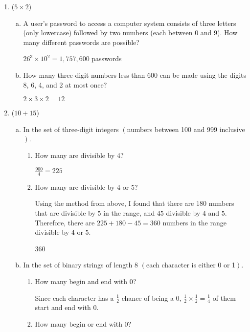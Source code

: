 \documentclass[12pt]{article}
\begin{document}
	\begin{enumerate}

		\item ($5 \times 2$)
		\begin{enumerate}[a.]
			\item
			A user's password to access a computer system consists of three letters (only lowercase) followed by two numbers (each between 0 and 9). How many different passwords are possible?

			$26^3 \times 10^2 = 1,757,600$ passwords

			\item
			How many three-digit numbers less than 600 can be made using the digits 8, 6, 4, and 2 at most once?

			$2 \times 3 \times 2 = 12$
		\end{enumerate}

	\newpage

		\item ($10 + 15$)
		\begin{enumerate}[a.]
			\item
			In the set of three-digit integers $\left( \right.$numbers between 100 and 999 inclusive$\left. \right)$.
			\begin{enumerate}
				\item  How many are divisible by 4?

				$\frac{900}{4} = 225$

				\item  How many are divisible by 4 or 5?

				Using the method from above, I found that there are $180$ numbers that are divisible by $5$ in the range, and $45$ divisible by $4$ and $5$. Therefore, there are $225 + 180 - 45 = 360$ numbers in the range divisible by 4 or 5.

				360

			\end{enumerate}
			\item
			In the set of binary strings of length 8 $\left( \right.$each character is either 0 or 1$\left. \right)$.
			\begin{enumerate}
				\item How many begin and end with 0?

				Since each character has a $\frac{1}{2}$ chance of being a $0$, $\frac{1}{2} \times \frac{1}{2} = \frac{1}{4}$ of them start and end with $0$.

				\item How many begin or end with 0?


\end{enumerate}
\end{enumerate}
\end{enumerate}
\end{document}
